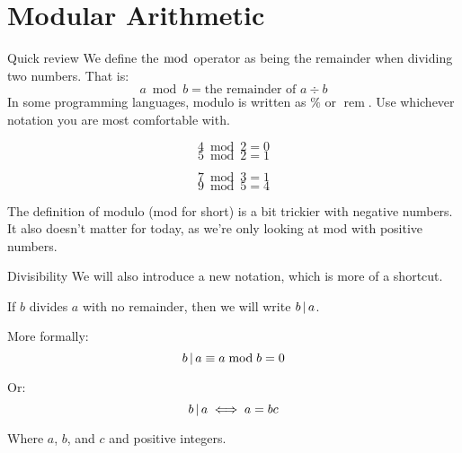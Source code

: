 \section{Modular Arithmetic}
\begin{namedframe}{Quick review}
	We define the \alert{$\bmod$} operator as being the remainder when dividing two numbers.
	That is:
	\[a \bmod b = \text{the remainder of } a \div b\]
	In some programming languages, modulo is written as \alert{$\%$} or \alert{$\operatorname{rem}$}.
	Use whichever notation you are most comfortable with.
	\begin{examples}
		\centering
		\begin{minipage}{0.45\textwidth}
			\[4 \bmod 2 = 0\]
			\[5 \bmod 2 = 1\]
		\end{minipage}
		\begin{minipage}{0.45\textwidth}
			\[7 \bmod 3 = 1\]
			\[9 \bmod 5 = 4\]
		\end{minipage}
	\end{examples}
	\footnotesize
	The definition of modulo (mod for short) is a bit trickier with negative numbers.
	It also doesn't matter for today, as we're only looking at mod with positive numbers.
\end{namedframe}
\begin{namedframe}{Divisibility}
	We will also introduce a new notation, which is more of a shortcut.

	If $b$ divides $a$ with no remainder, then we will write $b \operatorname{|} a$.

	More formally:
	\[b \operatorname{|} a \equiv a \bmod b = 0\]

	Or:
	\[b \operatorname{|} a \iff a = bc\]

	Where $a$, $b$, and $c$ and positive integers.
\end{namedframe}
